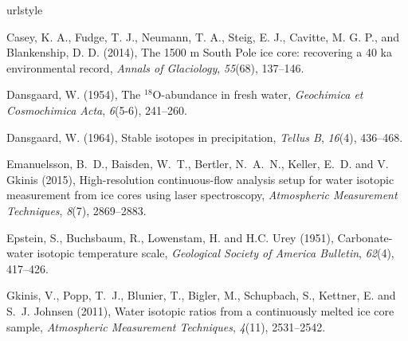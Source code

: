 \documentclass[draft, jgrga]{AGUTeX}
\begin{document}
\begin{article}




\begin{thebibliography}{}

\providecommand{\natexlab}[1]{#1}
\expandafter\ifx\csname urlstyle\endcsname\relax
  \providecommand{\doi}[1]{doi:\discretionary{}{}{}#1}\else
  \providecommand{\doi}{doi:\discretionary{}{}{}\begingroup
  \urlstyle{rm}\Url}\fi


 Casey, K. A., Fudge, T. J., Neumann, T. A., Steig, E. J., Cavitte, M. G. P., and Blankenship, D. D. (2014), The 1500 m South Pole ice core: recovering a 40 ka environmental record, \textit{Annals of Glaciology}, \textit{55}(68), 137--146.

 Dansgaard, W. (1954),
The $^{18}${O}-abundance in fresh water,
\textit{Geochimica et Cosmochimica Acta}, \textit{6}(5-6), 241--260.

 Dansgaard, W. (1964),
Stable isotopes in precipitation,
\textit{Tellus B}, \textit{16}(4), 436--468.

Emanuelsson, B.~D., Baisden, W.~T., Bertler, N.~A.~N., Keller, E.~D. and V. Gkinis (2015),
High-resolution continuous-flow analysis setup for water isotopic measurement from ice cores using laser spectroscopy,
\textit{Atmospheric Measurement Techniques}, \textit{8}(7), 2869--2883.

Epstein, S., Buchsbaum, R., Lowenstam, H. and H.C. Urey (1951),
Carbonate-water isotopic temperature scale,
\textit{Geological Society of America Bulletin}, \textit{62}(4), 417--426.

Gkinis, V., Popp, T.~J., Blunier, T., Bigler, M., Schupbach, S., Kettner, E. and S.~J. Johnsen (2011),
Water isotopic ratios from a continuously melted ice core sample,
\textit{Atmospheric Measurement Techniques}, \textit{4}(11), 2531--2542.


\end{thebibliography}
\end{article}
\end{document}
